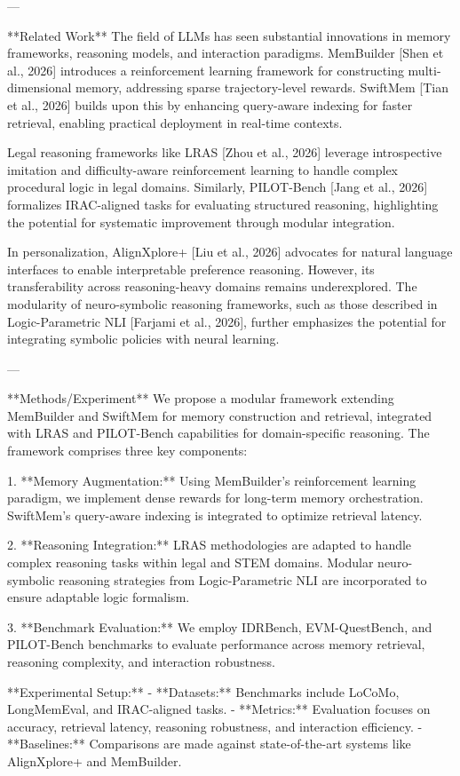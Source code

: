 ---

**Related Work**  
The field of LLMs has seen substantial innovations in memory frameworks, reasoning models, and interaction paradigms. MemBuilder [Shen et al., 2026] introduces a reinforcement learning framework for constructing multi-dimensional memory, addressing sparse trajectory-level rewards. SwiftMem [Tian et al., 2026] builds upon this by enhancing query-aware indexing for faster retrieval, enabling practical deployment in real-time contexts.

Legal reasoning frameworks like LRAS [Zhou et al., 2026] leverage introspective imitation and difficulty-aware reinforcement learning to handle complex procedural logic in legal domains. Similarly, PILOT-Bench [Jang et al., 2026] formalizes IRAC-aligned tasks for evaluating structured reasoning, highlighting the potential for systematic improvement through modular integration.

In personalization, AlignXplore+ [Liu et al., 2026] advocates for natural language interfaces to enable interpretable preference reasoning. However, its transferability across reasoning-heavy domains remains underexplored. The modularity of neuro-symbolic reasoning frameworks, such as those described in Logic-Parametric NLI [Farjami et al., 2026], further emphasizes the potential for integrating symbolic policies with neural learning.

---

**Methods/Experiment**  
We propose a modular framework extending MemBuilder and SwiftMem for memory construction and retrieval, integrated with LRAS and PILOT-Bench capabilities for domain-specific reasoning. The framework comprises three key components:

1. **Memory Augmentation:** Using MemBuilder's reinforcement learning paradigm, we implement dense rewards for long-term memory orchestration. SwiftMem's query-aware indexing is integrated to optimize retrieval latency.
   
2. **Reasoning Integration:** LRAS methodologies are adapted to handle complex reasoning tasks within legal and STEM domains. Modular neuro-symbolic reasoning strategies from Logic-Parametric NLI are incorporated to ensure adaptable logic formalism.

3. **Benchmark Evaluation:** We employ IDRBench, EVM-QuestBench, and PILOT-Bench benchmarks to evaluate performance across memory retrieval, reasoning complexity, and interaction robustness.

**Experimental Setup:**  
- **Datasets:** Benchmarks include LoCoMo, LongMemEval, and IRAC-aligned tasks.
- **Metrics:** Evaluation focuses on accuracy, retrieval latency, reasoning robustness, and interaction efficiency.
- **Baselines:** Comparisons are made against state-of-the-art systems like AlignXplore+ and MemBuilder.

